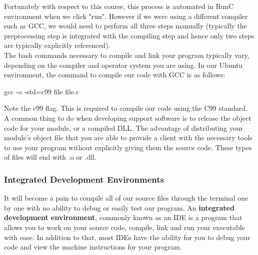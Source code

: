 Fortunately with respect to this course, this process is automated in RunC environment when we click "run". However if we were using a different compiler such as GCC, we would need to perform all three steps manually (typically the preprocessing step is integrated with the compiling step and hence only two steps are typically explicitly referenced).\\

The bash commands necessary to compile and link your program typically vary, depending on the compiler and operator system you are using. In our Ubuntu environment, the command to compile our code with GCC is as follows:\\

\begin{code}[bash]
gcc -o -std=c99 file file.c
\end{code}

Note the c99 flag. This is required to compile our code using the C99 standard.\\

A common thing to do when developing support software is to release the object code for your module, or a compiled DLL. The advantage of distributing your module's object file that you are able to provide a client with the necessary tools to use your program without explicitly giving them the source code. These types of files will end with .o or .dll.\\


\subsubsection*{Integrated Development Environments}

It will become a pain to compile all of our source files through the terminal one by one with no ability to debug or easily test our program. An \textbf{integrated development environment}, commonly known as an IDE is a program that allows you to work on your source code, compile, link and run your executable with ease. In addition to that, most IDEs have the ability for you to debug your code and view the machine instructions for your program.\\

